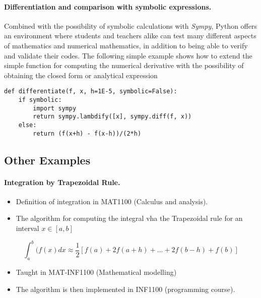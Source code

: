 \documentclass[%
twoside,                 %
final,                   %
10pt]{article}
\begin{document}
\paragraph{Differentiation and comparison with symbolic expressions.}
Combined with the possibility of symbolic calculations with \emph{Sympy}, Python offers an environment where students and teachers alike can test many different aspects of mathematics and numerical mathematics, in addition to being able to verify and validate their codes. The following simple example shows how to extend the simple function for computing the numerical derivative with the possibility of obtaining the closed form or analytical expression
\begin{verbatim}
def differentiate(f, x, h=1E-5, symbolic=False):
    if symbolic:
        import sympy
        return sympy.lambdify([x], sympy.diff(f, x))
    else:
        return (f(x+h) - f(x-h))/(2*h)
\end{verbatim}





\subsection*{Other Examples}

\paragraph{Integration by Trapezoidal Rule.}

\begin{itemize}
\item Definition of integration  in MAT1100 (Calculus and analysis).

\item The algorithm for computing the  integral vha the Trapezoidal rule for an interval $x \in [a,b]$
\end{itemize}

\noindent
\[
  \int_a^b(f(x) dx \approx \frac{1}{2}\left [f(a)+2f(a+h)+\dots+2f(b-h)+f(b)\right] 
\]
\begin{itemize}
\item Taught   in MAT-INF1100  (Mathematical modelling)

\item The algorithm is then implemented in  INF1100 (programming course).
\end{itemize}
\end{document}
